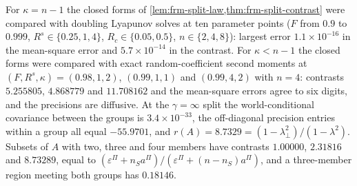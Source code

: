 \begin{numcheck}\label{chk:frm-split-law}
For $\kappa=n-1$ the closed forms of \cref{lem:frm-split-law,thm:frm-split-contrast} were compared with doubling Lyapunov solves at ten parameter points ($F$ from $0.9$ to $0.999$, $R^s\in\{0.25,1,4\}$, $R_c\in\{0.05,0.5\}$, $n\in\{2,4,8\}$): largest error $1.1\times10^{-16}$ in the mean-square error and $5.7\times10^{-14}$ in the contrast. For $\kappa<n-1$ the closed forms were compared with exact random-coefficient second moments at $(F,R^s,\kappa)=(0.98,1,2)$, $(0.99,1,1)$ and $(0.99,4,2)$ with $n=4$: contrasts $5.255805$, $4.868779$ and $11.708162$ and the mean-square errors agree to six digits, and the precisions are diffusive. At the $\gamma=\infty$ split the world-conditional covariance between the groups is $3.4\times10^{-33}$, the off-diagonal precision entries within a group all equal $-55.9701$, and $r(A)=8.7329=(1-\lambda_\perp^2)/(1-\lambda^2)$. Subsets of $A$ with two, three and four members have contrasts $1.00000$, $2.31816$ and $8.73289$, equal to $(\varepsilon^\Pi+n_Sa^\Pi)/(\varepsilon^\Pi+(n-n_S)a^\Pi)$, and a three-member region meeting both groups has $0.18146$.
\end{numcheck}

